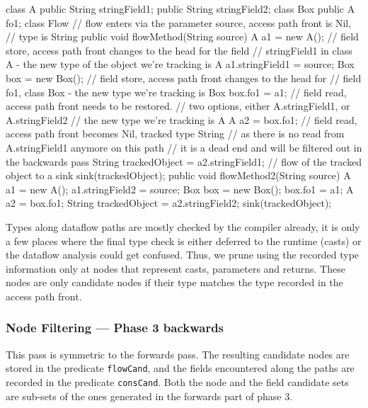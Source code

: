 \begin{listing}[H]
    \begin{javacode}
class A {
    public String stringField1;
    public String stringField2;
}
class Box {
    public A fo1;
}
class Flow {
    // flow enters via the parameter source, access path front is Nil,
    // type is String
    public void flowMethod(String source) {
        A a1 = new A();
        // field store, access path front changes to the head for the field 
        // stringField1 in class A - the new type of the object we're tracking is A
        a1.stringField1 = source;
        Box box = new Box();
        // field store, access path front changes to the head for
        // field fo1, class Box - the new type we're tracking is Box
        box.fo1 = a1;
        // field read, access path front needs to be restored.
        // two options, either A.stringField1, or A.stringField2
        // the new type we're tracking is A
        A a2 = box.fo1;
        // field read, access path front becomes Nil, tracked type String
        // as there is no read from A.stringField1 anymore on this path 
        // it is a dead end and will be filtered out in the backwards pass
        String trackedObject = a2.stringField1;
        // flow of the tracked object to a sink
        sink(trackedObject);
    }         
    public void flowMethod2(String source) {
        A a1 = new A();
        a1.stringField2 = source;
        Box box = new Box();
        box.fo1 = a1;
        A a2 = box.fo1;
        String trackedObject = a2.stringField2;
        sink(trackedObject);
    }
}
    \end{javacode}
\end{listing}

Types along dataflow paths are mostly checked by the compiler already, it is 
only a few places where the final type check is either deferred to the runtime 
(casts) or the dataflow analysis could get confused.
Thus, we prune using the recorded type information only at nodes that represent 
casts, parameters and returns.
These nodes are only candidate nodes if their type 
matches the type recorded in the access path front.

\subsubsection*{Node Filtering --- Phase 3 backwards}
This pass is symmetric to the forwards pass.
The resulting candidate nodes are stored in the predicate \texttt{flowCand},
and the fields encountered along the paths are recorded in
the predicate \texttt{consCand}.
Both the node and the field candidate sets are sub-sets of the ones generated
in the forwards part of phase 3.

